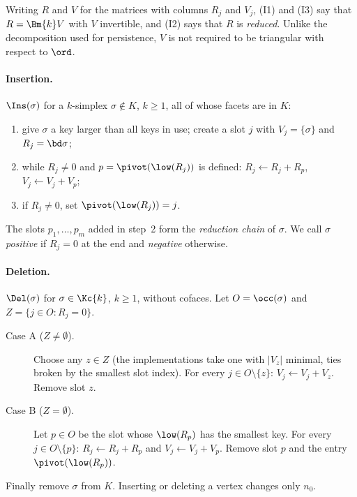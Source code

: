 Writing $R$ and $V$ for the matrices with columns $R_j$ and $V_j$, (I1) and (I3)
say that $R=\Bm{k}V$ with $V$ invertible, and (I2) says that $R$ is
\emph{reduced}. Unlike the decomposition used for persistence, $V$ is not
required to be triangular with respect to $\ord$.

\paragraph{Insertion.} $\Ins(\sigma)$ for a $k$-simplex $\sigma\notin K$, $k\ge1$,
all of whose facets are in $K$:
\begin{enumerate}
\item give $\sigma$ a key larger than all keys in use; create a slot $j$ with
  $V_j=\{\sigma\}$ and $R_j=\bd\sigma$;
\item while $R_j\ne0$ and $p=\pivot(\low(R_j))$ is defined: $R_j\gets R_j+R_p$,
  $V_j\gets V_j+V_p$;
\item if $R_j\ne0$, set $\pivot(\low(R_j))=j$.
\end{enumerate}
The slots $p_1,\dots,p_m$ added in step~2 form the \emph{reduction chain} of
$\sigma$. We call $\sigma$ \emph{positive} if $R_j=0$ at the end and
\emph{negative} otherwise.

\paragraph{Deletion.} $\Del(\sigma)$ for $\sigma\in\Kc{k}$, $k\ge1$, without
cofaces. Let $O=\occ(\sigma)$ and $Z=\{j\in O: R_j=0\}$.
\begin{description}
\item[Case A ($Z\ne\emptyset$).] Choose any $z\in Z$ (the implementations take
  one with $|V_z|$ minimal, ties broken by the smallest slot index). For every $j\in O\setminus\{z\}$:
  $V_j\gets V_j+V_z$. Remove slot $z$.
\item[Case B ($Z=\emptyset$).] Let $p\in O$ be the slot whose $\low(R_p)$ has
  the smallest key. For every $j\in O\setminus\{p\}$: $R_j\gets R_j+R_p$ and
  $V_j\gets V_j+V_p$. Remove slot $p$ and the entry $\pivot(\low(R_p))$.
\end{description}
Finally remove $\sigma$ from $K$. Inserting or deleting a vertex changes only
$n_0$.

